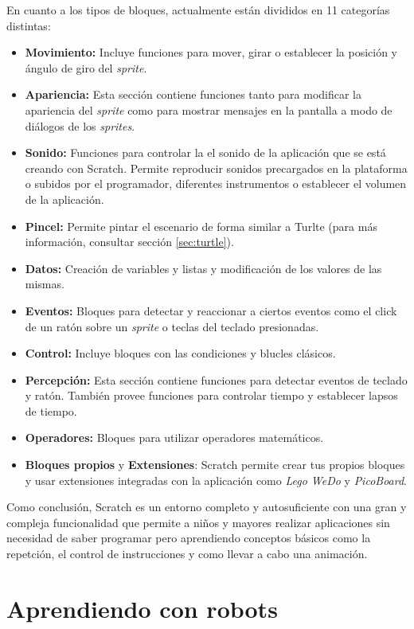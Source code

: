 En cuanto a los tipos de bloques, actualmente están divididos en 11 categorías distintas:
\begin{itemize}
	\item \textbf{Movimiento:} Incluye funciones para mover, girar o establecer la posición y ángulo de giro del \emph{sprite}.
	\item \textbf{Apariencia:} Esta sección contiene funciones tanto para modificar la apariencia del \emph{sprite} como para mostrar mensajes en la pantalla a modo de diálogos de los \emph{sprites}.
	\item \textbf{Sonido:} Funciones para controlar la el sonido de la aplicación que se está creando con Scratch. Permite reproducir sonidos precargados en la plataforma o subidos por el programador, diferentes instrumentos o establecer el volumen de la aplicación.
	\item \textbf{Pincel:} Permite pintar el escenario de forma similar a Turlte (para más información, consultar sección \ref{sec:turtle}).
	\item \textbf{Datos:} Creación de variables y listas y modificación de los valores de las mismas.
	\item \textbf{Eventos:} Bloques para detectar y reaccionar a ciertos eventos como el click de un ratón sobre un \emph{sprite} o teclas del teclado presionadas.
	\item \textbf{Control:} Incluye bloques con las condiciones y blucles clásicos.
	\item \textbf{Percepción:} Esta sección contiene funciones para detectar eventos de teclado y ratón. También provee funciones para controlar tiempo y establecer lapsos de tiempo. 
	\item \textbf{Operadores:} Bloques para utilizar operadores matemáticos.
	\item \textbf{Bloques propios} y \textbf{Extensiones}: Scratch permite crear tus propios bloques y usar extensiones integradas con la aplicación como \emph{Lego WeDo} y \emph{PicoBoard}. 
\end{itemize}


Como conclusión, Scratch es un entorno completo y autosuficiente con una gran y compleja funcionalidad que permite a niños y mayores realizar aplicaciones sin necesidad de saber programar pero aprendiendo conceptos básicos como la repetción, el control de instrucciones y como llevar a cabo una animación. 



\section{Aprendiendo con robots}
\label{sec:aprendiendo-robots}


